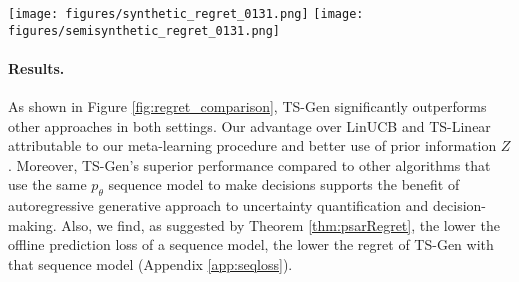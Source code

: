 \begin{figure*}[t]
\centering
\texttt{[image: figures/synthetic\_regret\_0131.png]}
\hfill
\texttt{[image: figures/semisynthetic\_regret\_0131.png]}
\caption{Cumulative regret for synthetic (left) and semisynthetic (right) settings, averaged over 500 bandit tasks each. 
TS-Gen performs well compared to other algorithms, including others that use the same sequence model $p_\theta$ (Greedy, Epsilon-Greedy, Softmax). Regret is against the best fitting policy in $\Pi^*$ (logistic for synthetic, and tree-based for semisynthetic). Error bars (barely visible) denote $\pm 1$ s.e. 
}
\label{fig:regret_comparison}
\end{figure*}

\paragraph{Results.} 
As shown in Figure \ref{fig:regret_comparison}, TS-Gen significantly outperforms other approaches in both settings. Our advantage over LinUCB and TS-Linear attributable to our meta-learning procedure and better use of prior information $Z$. Moreover, TS-Gen's superior performance compared to other algorithms that use the same $p_\theta$ sequence model to make decisions 
supports the benefit of autoregressive generative approach to uncertainty quantification and decision-making. Also, we find, as suggested by Theorem \ref{thm:psarRegret}, the lower the offline prediction loss of a sequence model, the lower the regret of TS-Gen with that sequence model (Appendix \ref{app:seqloss}).


